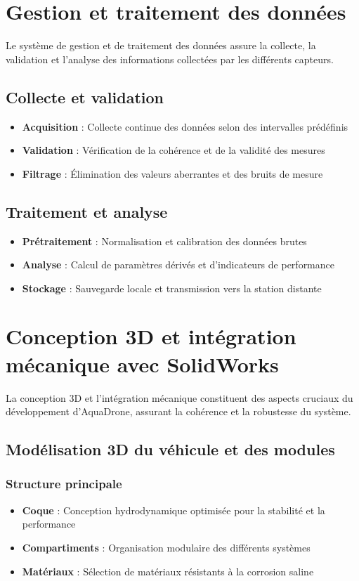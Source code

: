 {\section{Gestion et traitement des données}
Le système de gestion et de traitement des données assure la collecte, la validation et l'analyse des informations collectées par les différents capteurs.

\subsection{Collecte et validation}
\begin{itemize}
    \item \textbf{Acquisition} : Collecte continue des données selon des intervalles prédéfinis
    \item \textbf{Validation} : Vérification de la cohérence et de la validité des mesures
    \item \textbf{Filtrage} : Élimination des valeurs aberrantes et des bruits de mesure
\end{itemize}

\subsection{Traitement et analyse}
\begin{itemize}
    \item \textbf{Prétraitement} : Normalisation et calibration des données brutes
    \item \textbf{Analyse} : Calcul de paramètres dérivés et d'indicateurs de performance
    \item \textbf{Stockage} : Sauvegarde locale et transmission vers la station distante
\end{itemize}

\section{Conception 3D et intégration mécanique avec SolidWorks}
La conception 3D et l'intégration mécanique constituent des aspects cruciaux du développement d'AquaDrone, assurant la cohérence et la robustesse du système.

\subsection{Modélisation 3D du véhicule et des modules}
\subsubsection{Structure principale}
\begin{itemize}
    \item \textbf{Coque} : Conception hydrodynamique optimisée pour la stabilité et la performance
    \item \textbf{Compartiments} : Organisation modulaire des différents systèmes
    \item \textbf{Matériaux} : Sélection de matériaux résistants à la corrosion saline
\end{itemize}

}
